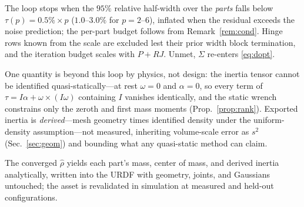 The loop stops when the $95\%$ relative half-width over the \emph{parts}
falls below $\tau(p)=0.5\%\times p$ ($1.0$--$3.0\%$ for $p=2$--$6$), inflated
when the residual exceeds the noise prediction; the per-part budget follows
from Remark~\ref{rem:cond}. Hinge rows known from the scale are excluded lest
their prior width block termination, and the iteration budget scales with
$P+RJ$. Unmet, $\Sigma$ re-enters \eqref{eq:dopt}.

One quantity is beyond this loop by physics, not design: the inertia tensor
cannot be identified quasi-statically---at rest $\omega=0$ and $\alpha=0$, so
every term of $\tau=I\alpha+\omega\times(I\omega)$ containing $I$ vanishes
identically, and the static wrench constrains only the zeroth and first mass
moments (Prop.~\ref{prop:rank}). Exported inertia is \emph{derived}---mesh
geometry times identified density under the uniform-density assumption---not
measured, inheriting volume-scale error as $s^2$ (Sec.~\ref{sec:geom}) and
bounding what any quasi-static method can claim.

The converged $\hat\rho$ yields each part's mass, center of mass, and derived
inertia analytically, written into the URDF with geometry, joints, and
Gaussians untouched; the asset is revalidated in simulation at measured
and held-out configurations.
